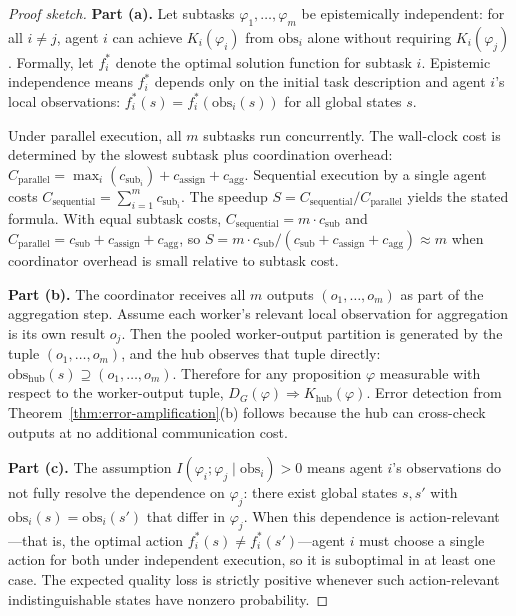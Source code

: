 \begin{proof}[Proof sketch]
\textbf{Part (a).} Let subtasks $\varphi_1, \ldots, \varphi_m$ be epistemically independent: for all $i \ne j$, agent $i$ can achieve $K_i(\varphi_i)$ from $\mathrm{obs}_i$ alone without requiring $K_i(\varphi_j)$. Formally, let $f_i^*$ denote the optimal solution function for subtask $i$. Epistemic independence means $f_i^*$ depends only on the initial task description and agent $i$'s local observations: $f_i^*(s) = f_i^*(\mathrm{obs}_i(s))$ for all global states $s$.

Under parallel execution, all $m$ subtasks run concurrently. The wall-clock cost is determined by the slowest subtask plus coordination overhead: $C_{\mathrm{parallel}} = \max_i(c_{\mathrm{sub}_i}) + c_{\mathrm{assign}} + c_{\mathrm{agg}}$. Sequential execution by a single agent costs $C_{\mathrm{sequential}} = \sum_{i=1}^m c_{\mathrm{sub}_i}$. The speedup $S = C_{\mathrm{sequential}}/C_{\mathrm{parallel}}$ yields the stated formula. With equal subtask costs, $C_{\mathrm{sequential}} = m \cdot c_{\mathrm{sub}}$ and $C_{\mathrm{parallel}} = c_{\mathrm{sub}} + c_{\mathrm{assign}} + c_{\mathrm{agg}}$, so $S = m \cdot c_{\mathrm{sub}} / (c_{\mathrm{sub}} + c_{\mathrm{assign}} + c_{\mathrm{agg}}) \approx m$ when coordinator overhead is small relative to subtask cost.

\textbf{Part (b).} The coordinator receives all $m$ outputs $(o_1, \ldots, o_m)$ as part of the aggregation step. Assume each worker's relevant local observation for aggregation is its own result $o_j$. Then the pooled worker-output partition is generated by the tuple $(o_1, \ldots, o_m)$, and the hub observes that tuple directly: $\mathrm{obs}_{\mathrm{hub}}(s) \supseteq (o_1, \ldots, o_m)$. Therefore for any proposition $\varphi$ measurable with respect to the worker-output tuple, $D_G(\varphi) \Rightarrow K_{\mathrm{hub}}(\varphi)$. Error detection from Theorem~\ref{thm:error-amplification}(b) follows because the hub can cross-check outputs at no additional communication cost.

\textbf{Part (c).} The assumption $I(\varphi_i; \varphi_j \mid \mathrm{obs}_i) > 0$ means agent $i$'s observations do not fully resolve the dependence on $\varphi_j$: there exist global states $s, s'$ with $\mathrm{obs}_i(s) = \mathrm{obs}_i(s')$ that differ in $\varphi_j$. When this dependence is action-relevant---that is, the optimal action $f_i^*(s) \ne f_i^*(s')$---agent $i$ must choose a single action for both under independent execution, so it is suboptimal in at least one case. The expected quality loss is strictly positive whenever such action-relevant indistinguishable states have nonzero probability.
\end{proof}

